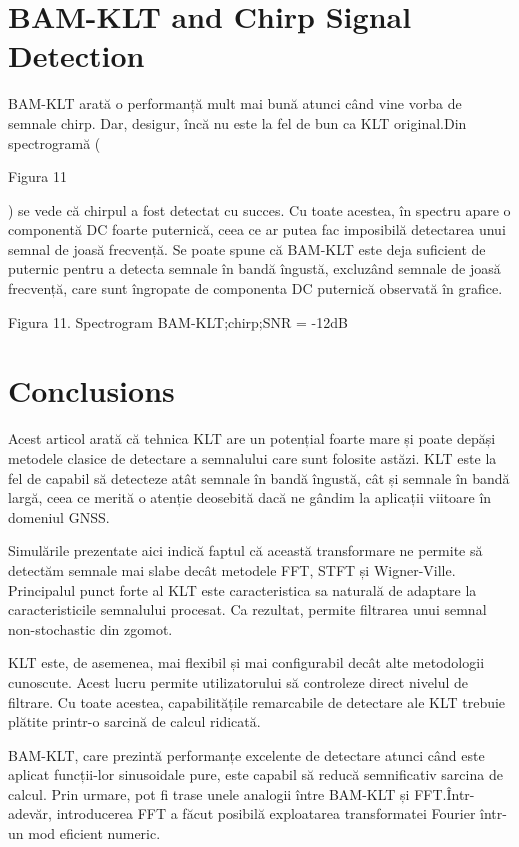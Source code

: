 \documentclass[12pt]{report}
\begin{document}
\section*{BAM-KLT and Chirp Signal Detection}
BAM-KLT arată o performanță mult mai bună atunci când vine vorba de semnale chirp.
Dar, desigur, încă nu este la fel de bun ca KLT original.\@ Din spectrogramă (\begin{normalsize}\color{red}Figura 11\end{normalsize}) se vede că chirpul a fost detectat cu succes. Cu toate acestea, în spectru apare o componentă DC foarte puternică, ceea ce ar putea
fac imposibilă detectarea unui semnal de joasă frecvență. Se poate spune că BAM-KLT este deja suficient de puternic pentru a detecta semnale în bandă îngustă, excluzând semnale de joasă frecvență, care sunt îngropate de componenta DC puternică observată în grafice.
\begin{center}
	\color{blue}Figura 11. Spectrogram BAM-KLT;\@ chirp;\@ SNR = -12dB
\end{center}

\section*{Conclusions}

Acest articol arată că tehnica KLT are un potențial foarte mare și poate depăși metodele clasice de detectare a semnalului care sunt folosite astăzi. KLT este la fel de capabil să detecteze atât semnale în bandă îngustă, cât și semnale în bandă largă, ceea ce merită o atenție deosebită dacă
ne gândim la aplicații viitoare în domeniul GNSS.

Simulările prezentate aici indică faptul că această transformare ne permite să detectăm semnale mai slabe decât metodele FFT, STFT și Wigner-Ville. Principalul punct forte al KLT este caracteristica sa naturală de adaptare la caracteristicile semnalului procesat. Ca rezultat, permite filtrarea unui semnal non-stochastic din zgomot.

KLT este, de asemenea, mai flexibil și mai configurabil decât alte metodologii cunoscute. Acest lucru permite utilizatorului să controleze direct nivelul de filtrare. Cu toate acestea, capabilitățile remarcabile de detectare ale KLT trebuie plătite printr-o sarcină de calcul ridicată.

BAM-KLT, care prezintă performanțe excelente de detectare atunci când este aplicat funcții-lor sinusoidale pure, este capabil să reducă semnificativ sarcina de calcul. Prin urmare, pot fi trase unele analogii între BAM-KLT și FFT.\@ Într-adevăr, introducerea FFT a făcut posibilă exploatarea transformatei Fourier într-un mod eficient numeric.
\end{document}
